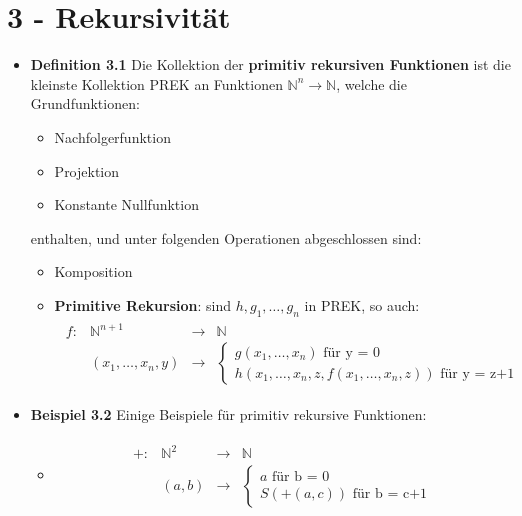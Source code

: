 \documentclass{scrartcl}
\begin{document}
\section*{3 - Rekursivität}
\begin{itemize}
    \item \textbf{Definition 3.1} Die Kollektion der \textbf{primitiv rekursiven Funktionen} ist die kleinste Kollektion PREK an Funktionen $\mathbb{N}^n \to \mathbb{N}$, welche die Grundfunktionen:
    \begin{itemize}
        \item Nachfolgerfunktion
        \item Projektion
        \item Konstante Nullfunktion
    \end{itemize}
    enthalten, und unter folgenden Operationen abgeschlossen sind:
    \begin{itemize}
        \item Komposition
        \item \textbf{Primitive Rekursion}: sind $h,g_1,\hdots,g_n$ in PREK, so auch:
        \begin{align*}
        \begin{array}{cccc}
           f:  & \mathbb{N}^{n+1} &\to& \mathbb{N}  \\
             & (x_1, \hdots, x_n,y) &\to& 
             \begin{cases}
             g(x_1, \hdots, x_n) \text{ für y = 0}\\
             h(x_1, \hdots, x_n, z, f(x_1,\hdots, x_n,z)) \text{ für y = z+1}
             \end{cases}
        \end{array}
        \end{align*}
    \end{itemize}
    \item \textbf{Beispiel 3.2} Einige Beispiele für primitiv rekursive Funktionen:
    \begin{itemize}
        \item \begin{align*}
        \begin{array}{cccc}
           +:  & \mathbb{N}^{2} &\to& \mathbb{N}  \\
             & (a,b) &\to& 
             \begin{cases}
             a \text{ für b = 0}\\
             S(+(a,c)) \text{ für b = c+1}
             \end{cases}

\end{array}
\end{align*}
\end{itemize}
\end{itemize}
\end{document}
